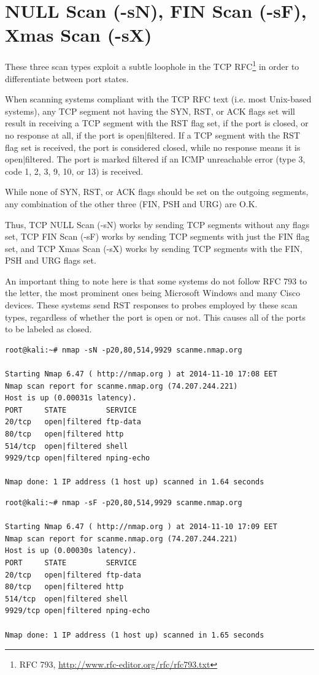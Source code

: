 \documentclass[a4paper,oneside,12pt]{book}
\begin{document}
\section{NULL Scan (-sN), FIN Scan (-sF), Xmas Scan (-sX)}

These three scan types exploit a subtle loophole in the TCP RFC\footnote{RFC 793, \url{http://www.rfc-editor.org/rfc/rfc793.txt}} in order to differentiate between port states. 

When scanning systems compliant with the TCP RFC text (i.e. most Unix-based systems), any TCP segment not having the SYN, RST, or ACK flags set will result in receiving a TCP segment with the RST flag set, if the port is closed, or no response at all, if the port is open|filtered. If a TCP segment with the RST flag set is received, the port is considered closed, while no response means it is open|filtered. The port is marked filtered if an ICMP unreachable error (type 3, code 1, 2, 3, 9, 10, or 13) is received. 

While none of SYN, RST, or ACK flags should be set on the outgoing segments, any combination of the other three (FIN, PSH and URG) are O.K.

Thus, TCP NULL Scan (-sN) works by sending TCP segments without any flags set, TCP FIN Scan (-sF) works by sending TCP segments with just the FIN flag set, and TCP Xmas Scan (-sX) works by sending TCP segments with the FIN, PSH and URG flags set.

An important thing to note here is that some systems do not follow RFC 793 to the letter, the most prominent ones being Microsoft Windows and many Cisco devices. These systems send RST responses to probes employed by these scan types, regardless of whether the port is open or not. This causes all of the ports to be labeled as closed.

\begin{lstlisting}[title=A sample Nmap scan using the NULL Scan option]
root@kali:~# nmap -sN -p20,80,514,9929 scanme.nmap.org

Starting Nmap 6.47 ( http://nmap.org ) at 2014-11-10 17:08 EET
Nmap scan report for scanme.nmap.org (74.207.244.221)
Host is up (0.00031s latency).
PORT     STATE         SERVICE
20/tcp   open|filtered ftp-data
80/tcp   open|filtered http
514/tcp  open|filtered shell
9929/tcp open|filtered nping-echo

Nmap done: 1 IP address (1 host up) scanned in 1.64 seconds
\end{lstlisting}

\begin{lstlisting}[title=A sample Nmap scan using the FIN Scan option]
root@kali:~# nmap -sF -p20,80,514,9929 scanme.nmap.org

Starting Nmap 6.47 ( http://nmap.org ) at 2014-11-10 17:09 EET
Nmap scan report for scanme.nmap.org (74.207.244.221)
Host is up (0.00030s latency).
PORT     STATE         SERVICE
20/tcp   open|filtered ftp-data
80/tcp   open|filtered http
514/tcp  open|filtered shell
9929/tcp open|filtered nping-echo

Nmap done: 1 IP address (1 host up) scanned in 1.65 seconds
\end{lstlisting}
\end{document}
